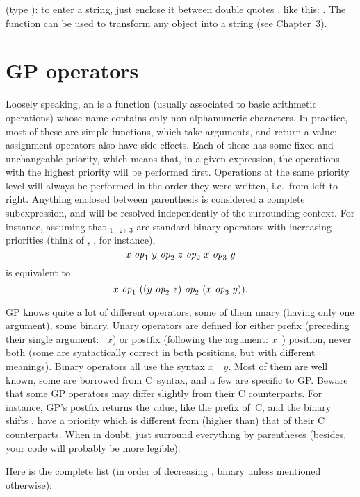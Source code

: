  (type ):
to enter a string, just enclose it between double quotes , like
this: . The function  can be used to
transform any object into a string (see Chapter~3).

\section{GP operators}\label{se:operators}

\noindent
Loosely speaking, an  is a function (usually associated to
basic arithmetic operations) whose name contains only non-alphanumeric
characters. In practice, most of these are simple functions, which take
arguments, and return a value; assignment operators also have side effects.
Each of these has some fixed and unchangeable priority, which means that,
in a given expression, the operations with the highest priority will be
performed first. Operations at the same priority level will always be
performed in the order they were written, i.e.~from left to right. Anything
enclosed between parenthesis is considered a complete subexpression, and
will be resolved independently of the surrounding context. For instance,
assuming that $_1$, $_2$, $_3$ are standard binary
operators with increasing priorities (think of \kbd{+}, \kbd{*}, \kbd{\pow}
for instance),
$$ x~\hbox{\it op\/}_1~y~\hbox{\it op\/}_2~z~\hbox{\it op\/}_2~x~\hbox{\it op\/}_3~y $$
is equivalent to
$$ x~\hbox{\it op\/}_1~((y~\hbox{\it op\/}_2~z)~\hbox{\it op\/}_2~ (x~\hbox{\it op\/}_3~y)).$$

GP knows quite a lot of different operators, some of them unary (having
only one argument), some binary. Unary operators are defined for either
prefix (preceding their single argument: ~$x$) or postfix (following
the argument: $x$~) position, never both
(some are syntactically correct in both positions, but with different
meanings). Binary operators all use the syntax $x$~~$y$. Most of
them are well known, some are borrowed from C~syntax, and a few are specific
to GP. Beware that some GP operators may differ slightly from their C
counterparts. For instance, GP's postfix \kbd{++} returns the 
value, like the prefix \kbd{++} of~C, and the binary shifts \kbd{<<},
\kbd{>>} have a priority which is different from (higher than) that of
their C counterparts.
When in doubt, just surround everything by parentheses (besides, your code
will probably be more legible).

\noindent Here is the complete list (in order of decreasing ,
binary unless mentioned otherwise):

